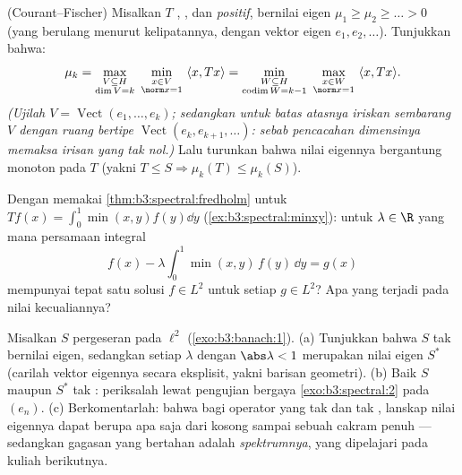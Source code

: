 \begin{exercise}[$\star\star\star$]\label{exo:b3:spectral:8}
(Courant--Fischer) Misalkan $T$ , , dan
\emph{positif}, bernilai eigen $\mu_1 \geq \mu_2 \geq \dots
> 0$ (yang berulang menurut kelipatannya, dengan vektor eigen $e_1, e_2,
\dots$). Tunjukkan bahwa:
\[
\mu_{k} = \max_{\substack{V \subseteq H \\ \dim V = k}}\
\min_{\substack{x \in V\\ \norm x = 1}}\ \langle x, Tx\rangle
= \min_{\substack{W \subseteq H\\ \operatorname{codim}W =
k-1}}\ \max_{\substack{x\in W\\ \norm x = 1}}\ \langle x,
Tx\rangle .
\]
\emph{(Ujilah $V = \operatorname{Vect}(e_1,\dots,e_k)$; sedangkan untuk
batas atasnya iriskan sembarang $V$ dengan
ruang bertipe $\operatorname{Vect}(e_k, e_{k+1}, \dots)$:
sebab pencacahan dimensinya memaksa irisan yang tak nol.)} Lalu turunkan
bahwa nilai eigennya bergantung monoton pada $T$ (yakni $T \leq S
\Rightarrow \mu_k(T) \leq \mu_k(S)$).
\end{exercise}

\begin{exercise}[$\star\star$]\label{exo:b3:spectral:9}
Dengan memakai \cref{thm:b3:spectral:fredholm} untuk $Tf(x) =
\int_0^1\min(x,y)f(y)\dd y$ (\cref{ex:b3:spectral:minxy}):
untuk $\lambda \in \R$ yang mana persamaan integral
\[
f(x) - \lambda\int_0^1\min(x,y)\,f(y)\,\dd y = g(x)
\]
mempunyai tepat satu solusi $f \in L^2$ untuk setiap $g \in L^2$? Apa
yang terjadi pada nilai kecualiannya?
\end{exercise}

\begin{exercise}[$\star\star\star$]\label{exo:b3:spectral:10}
Misalkan $S$ pergeseran pada $\ell^2$
(\cref{exo:b3:banach:1}).
(a) Tunjukkan bahwa $S$ tak bernilai eigen, sedangkan setiap $\lambda$
dengan $\abs\lambda < 1$ merupakan nilai eigen $S^*$ (carilah
vektor eigennya secara eksplisit, yakni barisan geometri).
(b) Baik $S$ maupun $S^*$ tak : periksalah lewat
pengujian bergaya \cref{exo:b3:spectral:2} pada $(e_n)$.
(c) Berkomentarlah: bahwa bagi operator yang tak  dan tak ,
lanskap nilai eigennya dapat berupa apa saja dari kosong sampai sebuah
cakram penuh --- sedangkan gagasan yang bertahan adalah \emph{spektrumnya},
yang dipelajari pada kuliah berikutnya.
\end{exercise}

